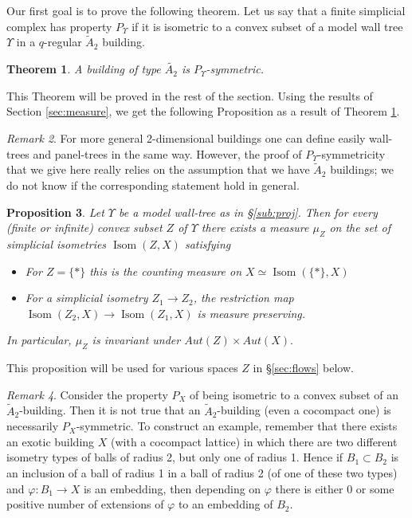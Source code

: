 \documentclass[a4paper, 11pt]{article}
\theoremstyle{plain}
\newtheorem{proposition}{Proposition}[section]
\newtheorem{theorem}[proposition]{Theorem}
\theoremstyle{definition}
\theoremstyle{remark}
\newtheorem{remark}[proposition]{Remark}
\DeclareMathOperator{\Isom}{Isom}
\begin{document}
Our first goal
is to prove the following theorem. Let us say that a finite simplicial complex has property $P_\Upsilon$  if it is isometric to a convex subset of a model wall tree $\Upsilon$ in a $q$-regular $\tilde A_2$ building.


\begin{theorem}\label{thm:Psymetric}
A building of type $\tilde{A_2}$ is $P_\Upsilon$-symmetric.
\end{theorem}

This Theorem will be proved in the rest of the section. Using the results of Section 
 \ref{sec:measure}, we get the following Proposition as a result of Theorem \ref{thm:Psymetric}.

\begin{remark}
    For more general 2-dimensional buildings one can define easily wall-trees and panel-trees in the same way. However, the proof of $P_\Upsilon$-symmetricity that we give here really relies on the assumption that we have $\tilde A_2$ buildings; we do not know if the corresponding statement hold in general.
\end{remark}

\begin{proposition}
Let $\Upsilon$ be a model wall-tree as in \S\ref{sub:proj}. Then for every (finite or infinite) convex subset $Z$ of $\Upsilon$ there exists a measure $\mu_Z$ on the set of simplicial isometries $\Isom(Z,X)$ satisfying
\begin{itemize}
\item For $Z=\{\ast\}$ this is the counting measure on $X \simeq \Isom(\{\ast\},X)$
\item For a simplicial isometry $Z_1 \to Z_2$, the restriction map $\Isom(Z_2,X) \to \Isom(Z_1,X)$ is measure preserving.
\end{itemize}

In particular, $\mu_Z$ is invariant under $Aut(Z) \times Aut(X).$
\end{proposition}

This proposition will be used for various spaces $Z$ in \S \ref{sec:flows} below.

\begin{remark}
    Consider the property $P_X$ of being isometric to a convex subset of an $\tilde A_2$-building.
    Then it is not true that an $\tilde A_2$-building (even a cocompact one) is necessarily $P_X$-symmetric. To construct an example, remember that there exists an exotic building $X$ (with a cocompact lattice) in which there are two different isometry types of balls of radius 2, but only one of radius 1. Hence if $B_1\subset B_2$ is an inclusion of a ball of radius 1 in a ball of radius 2 (of one of these two types) and $\varphi:B_1\to X$ is an embedding, then depending on $\varphi$ there is either 0 or some positive number of extensions of $\varphi$ to an embedding of $B_2$.
\end{remark}
\end{document}
